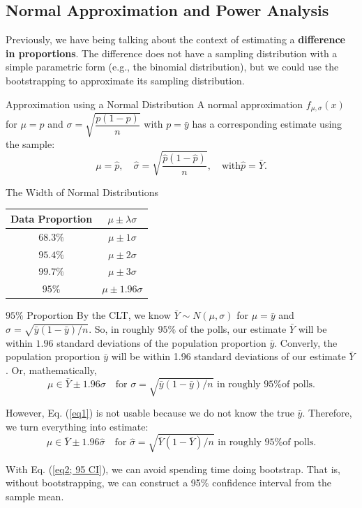 \subsection{Normal Approximation and Power Analysis}
Previously, we have being talking about the context of estimating a \textbf{difference in proportions}. The difference does not have a sampling distribution with a simple parametric form (e.g., the binomial distribution), but we could use the bootstrapping to approximate its sampling distribution. 
\begin{thm}{Approximation using a Normal Distribution}
	A normal approximation $f_{\mu,\sigma}(x)$ for $\mu=p$ and $\sigma=\sqrt{\dfrac{p(1-p)}{n}}$ with $p=\bar{y}$ has a corresponding estimate using the sample: \[\mu=\hat{p},\quad\hat\sigma=\sqrt{\dfrac{\hat p(1-\hat p)}{n}},\quad\text{with}\hat{p}=\bar{Y}.\]
\end{thm}
\begin{thm}{The Width of Normal Distributions}
	\begin{center}
	\begin{tabular}{c|c}
		Data Proportion & $\mu\pm\lambda\sigma$\\
		\hline
		$68.3\%$ & $\mu\pm1\sigma$\\
		$95.4\%$ & $\mu\pm2\sigma$\\
		$99.7\%$ & $\mu\pm3\sigma$\\
		$95\%$ & $\mu\pm1.96\sigma$
	\end{tabular}
	\end{center}
\end{thm}
\begin{eg}{$95\%$ Proportion}
By the CLT, we know $\bar{Y}\sim{N}(\mu,\sigma)$ for $\mu=\bar{y}$ and $\sigma=\sqrt{\bar{y}(1-\bar{y})/n}$. So, in roughly $95\%$ of the polls, our estimate $\bar{Y}$ will be within $1.96$ standard deviations of the population proportion $\bar{y}$. Converly, the population proportion $\bar{y}$ will be within 1.96 standard deviations of our estimate $\bar{Y}$. Or, mathematically, \begin{equation}\label{eq1}\mu\in\bar{Y}\pm1.96\sigma\quad\text{for }\sigma=\sqrt{\bar{y}(1-\bar{y})/n}\text{ in roughly 95\% of polls}.\end{equation}\par 
However, Eq. (\ref{eq1}) is not usable because we do not know the true $\bar{y}$. Therefore, we turn everything into estimate: \begin{equation}\label{eq2; 95 CI}\mu\in\bar{Y}\pm1.96\hat\sigma\quad\text{for }\hat\sigma=\sqrt{\bar{Y}(1-\bar{Y})/n}\text{ in roughly 95\% of polls}.\tag{95\% C.I.}
\end{equation}\par 
With Eq. (\ref{eq2; 95 CI}), we can avoid spending time doing bootstrap. That is, without bootstrapping, we can construct a 95\% confidence interval from the sample mean. 
\end{eg}
